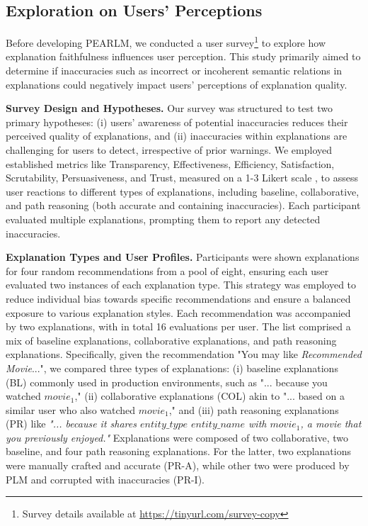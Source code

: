 \documentclass[sigconf]{acmart}
\begin{document}
\subsection{Exploration on Users' Perceptions}
\label{subsec:user-survey}
Before developing PEARLM, we conducted a user survey\footnote{Survey details available at \href{https://tinyurl.com/survey-copy}{https://tinyurl.com/survey-copy}} to explore how explanation faithfulness influences user perception. This study primarily aimed to determine if inaccuracies such as incorrect or incoherent semantic relations in explanations could negatively impact users' perceptions of explanation quality.

\vspace{1mm} \textbf{Survey Design and Hypotheses.} Our survey was structured to test two primary hypotheses: (i) users' awareness of potential inaccuracies reduces their perceived quality of explanations, and (ii) inaccuracies within explanations are challenging for users to detect, irrespective of prior warnings. We employed established metrics \cite{4401070} like Transparency, Effectiveness, Efficiency, Satisfaction, Scrutability, Persuasiveness, and Trust, measured on a 1-3 Likert scale \cite{10.1145/3397271.3401032}, to assess user reactions to different types of explanations, including baseline, collaborative, and path reasoning (both accurate and containing inaccuracies). Each participant evaluated multiple explanations, prompting them to report any detected inaccuracies.

\vspace{1mm} \noindent \textbf{Explanation Types and User Profiles.}
Participants were shown explanations for four random recommendations from a pool of eight, ensuring each user evaluated two instances of each explanation type. This strategy was employed to reduce individual bias towards specific recommendations and ensure a balanced exposure to various explanation styles. Each recommendation was accompanied by two explanations, with in total 16 evaluations per user. The list comprised a mix of baseline explanations, collaborative explanations, and path reasoning explanations. Specifically, given the recommendation "You may like \textit{Recommended Movie}...", we compared three types of explanations: (i) baseline explanations (BL) commonly used in production environments, such as "... because you watched $movie_1$," (ii) collaborative explanations (COL) akin to  "... based on a similar user who also watched $movie_1$," and (iii) path reasoning explanations (PR) like \emph{"... because it shares $entity\_type$ $entity\_name$ with $movie_1$, a movie that you previously enjoyed."} Explanations were composed of two collaborative, two baseline, and four path reasoning explanations. For the latter, two explanations were manually crafted and accurate (PR-A), while other two were produced by PLM and corrupted with inaccuracies (PR-I).
\end{document}
